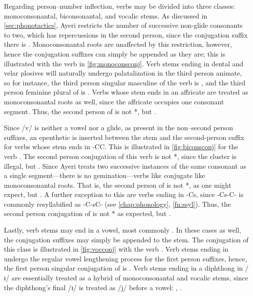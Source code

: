 Regarding person--number inflection, verbs may be divided into three classes: 
monoconsonantal, biconsonantal, and vocalic stems. As discussed in 
\autoref{sec:phonotactics}, Ayeri restricts the number of successive non-glide 
consonants to two, which has repercussions in the second person, since the 
conjugation suffix there is . Monoconsonantal roots are 
unaffected by this restriction, however, hence the conjugation suffixes can 
simply be appended as they are; this is illustrated with the verb 
 in \autoref{fig:monoconsconj}. Verb stems 
ending in dental and velar plosives will naturally undergo palatalization in 
the third person animate, so for instance, the third person singular masculine 
of the verb  is , and the third person feminine plural of  is . Verbs whose 
stem ends in an affricate are treated as monoconsonantal roots as well, since 
the affricate occupies one consonant segment. Thus, the second person of 
 is not *, but 
.

Since /v/ is neither a vowel nor a glide, as present in the non–second 
person suffixes, an epenthetic  is inserted between the stem and 
the second-person suffix for verbs whose stem ends in -CC. This is illustrated 
in \autoref{fig:biconsconj} for the verb . The 
second person conjugation of this verb is not *, since 
the cluster  is illegal, but . Since Ayeri 
treats two successive instances of the same consonant as a single 
segment---there is no gemination---verbs like  
conjugate like monoconsonantal roots. That is, the second person of 
 is not *, as one might expect, but 
. A further exception to this are verbs ending in -Cs, 
since -Cs-C- is commonly resyllabified as -C-sC- (see \autoref{chap:phonology}, 
\autoref{fn:ssyl}). Thus, the second person conjugation of 
 is not * as expected, but 
.

Lastly, verb stems may end in a vowel, most commonly . In these cases as 
well, the conjugation suffixes may simply be appended to the stem. The 
conjugation of this class is illustrated in \autoref{fig:vocconj} with the verb 
. Verb stems ending in  undergo the regular vowel 
lengthening process for the first person suffixes, hence, the first person 
singular conjugation of  is . 
Verb stems ending in a diphthong in /ɪ/ are essentially treated as a hybrid of 
monoconsonantal and vocalic stems, since the diphthong's final /ɪ/ is treated 
as /j/ before a vowel: , 
.

